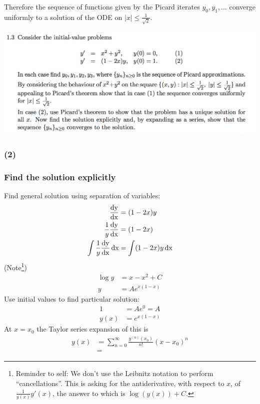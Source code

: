 \documentclass[12pt]{article}
\begin{document}
Therefore the sequence of functions given by the Picard iterates
$y_0, y_1, \ldots$ converge uniformly to a solution of the ODE on $|x| \leq \frac{1}{\sqrt{2}}$.

\newpage
\begin{mdframed}
\includegraphics[width=400pt]{img/differential-equations-a1-1-3.png}\\
\end{mdframed}
\subsubsection*{(2)}

\subsubsection*{Find the solution explicitly}
Find general solution using separation of variables:
\begin{align*}
  \frac{\operatorname{\text{dy}}}{\operatorname{\text{dx}}} &= (1 - 2x)y\\
  \frac{1}{y}\frac{\operatorname{\text{dy}}}{\operatorname{\text{dx}}} &= (1 - 2x)\\
  \int \frac{1}{y} \frac{\operatorname{\text{dy}}}{\operatorname{\text{dx}}} \operatorname{\text{dx}} &= \int (1 - 2x)y \operatorname{\text{dx}}
\end{align*}
(Note\footnote{Reminder to self: We don't use the Leibnitz notation to perform
  ``cancellations''. This is asking for the antiderivative, with respect to $x$,
  of $\frac{1}{y(x)}y'(x)$, the answer to which is $\log(y(x)) + C$.})
\begin{align*}
  \log y  &= x - x^2 + C\\
  y &= Ae^{x(1-x)}
\end{align*}
Use initial values to find particular solution:
\begin{align*}
  1 &= Ae^0 = A\\
  y(x) &= e^{x(1-x)}
\end{align*}
At $x=x_0$ the Taylor series expansion of this is
\begin{align*}
  y(x) &= \sum_{n=0}^\infty \frac{y^{(n)}(x_0)}{n!} (x - x_0)^n\\
       &=
\end{align*}
\end{document}

